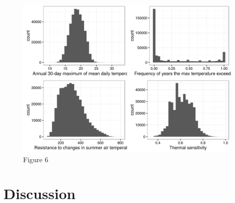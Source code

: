 \begin{figure}[htbp]
\centering
\includegraphics{Figures/metrics_histograms.jpg}
\caption{Figure 6}
\end{figure}

\section{Discussion}\label{discussion}

